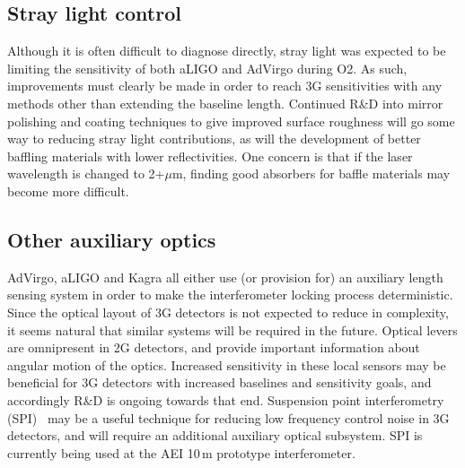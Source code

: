 
\subsection{Stray light control}
Although it is often difficult to diagnose directly, stray light was expected to be  limiting the sensitivity of both aLIGO and AdVirgo during O2. As such, improvements must clearly be made in order to reach 3G sensitivities with any methods other than extending the baseline length. Continued R\&D into mirror polishing and coating techniques to give improved surface roughness will go some way to reducing stray light contributions, as will the development of better baffling materials with lower reflectivities. One concern is that if the laser wavelength is changed to 2+$\mu$m, finding good absorbers for baffle materials may become more difficult. 


\subsection{Other auxiliary optics}
AdVirgo, aLIGO and Kagra all either use (or provision for) an auxiliary length sensing system in order to make the interferometer locking process deterministic. Since the optical layout of 3G detectors is not expected to reduce in complexity, it seems natural that similar systems will be required in the future. Optical levers are  omnipresent in 2G detectors, and provide important information about angular motion of the optics. Increased sensitivity in these local sensors may be beneficial for 3G detectors with increased baselines and sensitivity goals, and accordingly R\&D is ongoing towards that end. Suspension point interferometry (SPI)~\cite{SPI} may be a useful technique for reducing low frequency control noise in 3G detectors, and will require an additional auxiliary optical subsystem. SPI is currently being used at the AEI 10\,m prototype interferometer.   

